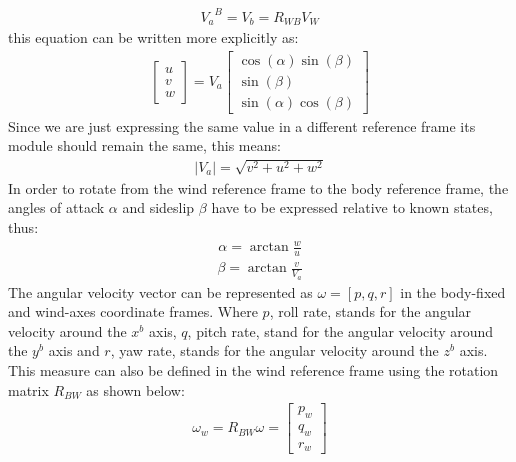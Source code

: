 \documentclass[twocolumn,showpacs,
    nofootinbib,aps,superscriptaddress,
    eqsecnum,prd,showkeys,10pt,floatfix]{revtex4}
\begin{document}
\begin{align}
    {V_a}^B={V_b}={R_{WB}V_W}
    \label{TrueAirspeedMatrixForm}
\end{align}
this equation can be written more explicitly as:
\begin{align}
    {\begin{bmatrix}
             u \\
             v \\w
         \end{bmatrix}}=V_a{\begin{bmatrix}
                            \cos(\alpha)\sin(\beta) \\
                            \sin(\beta)             \\
                            \sin(\alpha)\cos(\beta)
                        \end{bmatrix}}
    \label{TrueAirspeedComplete}
\end{align}
Since we are just expressing the same value in a different reference frame its module should remain the same, this means:
\begin{align}
    {\lvert V_a \rvert}=\sqrt{v^2+u^2+w^2}
    \label{TrueAirspeedModule}
\end{align}
In order to rotate from the wind reference frame to the body reference frame, the angles of attack $\alpha$ and sideslip $\beta$ have to be expressed relative to known states, thus:
\begin{align}
    {\alpha}=\arctan{\frac{w}{u}}
    \label{AlphaFormula}
\end{align}
\begin{align}
    {\beta}=\arctan{\frac{v}{V_a}}
    \label{BetaFormula}
\end{align}
The angular velocity vector can be represented as $\omega={[p,q,r]}$ in the body-fixed and wind-axes coordinate frames.
Where $p$, roll rate, stands for the angular velocity around the $x^b$ axis, $q$, pitch rate, stand for the angular velocity around the $y^b$ axis and $r$, yaw rate, stands for the angular velocity around the $z^b$ axis.
This measure can also be defined in the wind reference frame using the rotation matrix $R_{BW}$ as shown below:
\begin{align}
    \omega_w=R_{BW}\omega=\begin{bmatrix}
                              p_w \\
                              q_w \\
                              r_w
                          \end{bmatrix}
    \label{AngularVelocityInWind}
\end{align}
\end{document}
